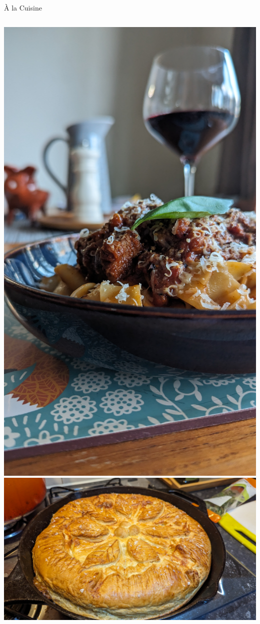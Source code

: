 \documentclass[10pt]{beamer}
\begin{document}
\begin{frame}{\`A la Cuisine}
\begin{columns}
        \includegraphics[width=\textwidth]{ragu}
      \includegraphics[width=\textwidth]{pie}\\

\end{columns}
\end{frame}
\end{document}
